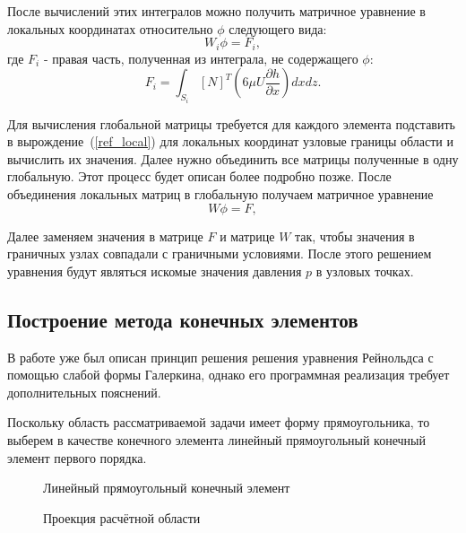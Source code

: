 \documentclass[a4paper,14pt]{extarticle}
\begin{document}
После вычислений этих интегралов можно получить матричное уравнение в локальных координатах относительно $\phi$ следующего вида:
\begin{equation}
W_i \phi = F_i,
\label{ref_local}
\end{equation}
где $F_i$ - правая часть, полученная из интеграла, не содержащего $\phi$:
\begin{equation*}
	F_i = \int_{S_i} [N]^T\left(6 \mu U \frac{\partial h}{\partial x}\right) dx dz.
\end{equation*}

Для вычисления глобальной матрицы требуется для каждого элемента подставить в вырождение~(\ref{ref_local}) для локальных координат узловые границы области и вычислить их значения. 
Далее нужно объединить все матрицы полученные в одну глобальную. Этот процесс будет описан более подробно позже.
После объединения локальных матриц в глобальную получаем матричное уравнение 
\begin{equation*}
	W \phi = F,
\end{equation*}

Далее заменяем значения в матрице $F$ и матрице $W$ так, чтобы значения в граничных узлах совпадали с граничными условиями.
После этого решением уравнения будут являться искомые значения давления $p$ в узловых точках.

\subsection{Построение метода конечных элементов}
В работе уже был описан принцип решения решения уравнения Рейнольдса с помощью слабой формы Галеркина, однако его программная реализация требует дополнительных пояснений.

Поскольку область рассматриваемой задачи имеет форму прямоугольника, то выберем в качестве конечного элемента линейный прямоугольный конечный элемент первого порядка.

\begin{figure}[!htbp]
	\caption{Линейный прямоугольный конечный элемент}
	\label{base_element}
\end{figure}
\begin{figure}[!htbp]
	\caption{Проекция расчётной области}
	\label{base_element_proection}
\end{figure}
\end{document}
